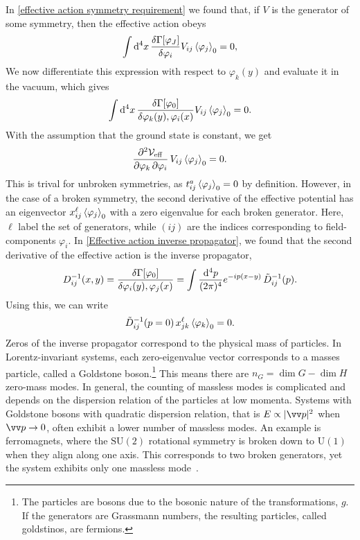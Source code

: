 In \autoref{effective action symmetry requirement} we found that, if $V$ is the generator of some symmetry, then the effective action obeys
\begin{equation}
    \int \dd^4 x\, \fdv{\Gamma[\varphi_J]}{\varphi_i} V_{ij} \ex{\varphi_j}_0 = 0,
\end{equation}
%
We now differentiate this expression with respect to $\varphi_k(y)$ and evaluate it in the vacuum, which gives
\begin{equation}
    \int \dd^4 x \, \fdv{\Gamma[\varphi_0]}{\varphi_k(y), \varphi_i(x)}
    V_{ij} \ex{\varphi_j}_0 = 0.
\end{equation}
%
With the assumption that the ground state is constant, we get 
\begin{equation}
    \pdv{\mathcal{V}_{\mathrm{eff}}}{\varphi_k, \varphi_i} \, V_{i j} \left\langle \varphi_j \right\rangle_0 = 0.
\end{equation}
%
This is trival for unbroken symmetries, as $t^a_{ij}\left\langle \varphi_j \right\rangle_0 = 0$ by definition.
However, in the case of a broken symmetry, the second derivative of the effective potential has an eigenvector $x^\ell_{ij} \left\langle \varphi_j \right\rangle_0$ with a zero eigenvalue for each broken generator.
Here, $\ell$ label the set of generators, while $(ij)$ are the indices corresponding to field-components $\varphi_i$.
In \autoref{Effective action inverse propagator}, we found that the second derivative of the effective action is the inverse propagator,
\begin{equation}
    D^{-1}_{ij}(x,y) 
    = \fdv{\Gamma[\varphi_0]}{\varphi_i(y), \varphi_j(x)}
    = \int \frac{\dd^4 p}{(2 \pi)^4} e^{-ip(x - y)} \, \tilde D^{-1}_{ij}(p).
\end{equation}
%
Using this, we can write
\begin{equation}
    \tilde D^{-1}_{i j}(p=0) \, x^\ell_{jk} \left\langle \varphi_k \right\rangle_0 
    = 0.
\end{equation}
%
Zeros of the inverse propagator correspond to the physical mass of particles.
In Lorentz-invariant systems, each zero-eigenvalue vector corresponds to a masses particle, called a Goldstone boson.\footnote{ The particles are bosons due to the bosonic nature of the transformations, $g$. If the generators are Grassmann numbers, the resulting particles, called goldstinos, are fermions.}
This means there are $n_G = \dim G -\dim H$ zero-mass modes.
In general, the counting of massless modes is complicated and depends on the dispersion relation of the particles at low momenta.
Systems with Goldstone bosons with quadratic dispersion relation, that is $E \propto |\vv p|^2$ when $\vv p \rightarrow 0$, often exhibit a lower number of massless modes.
An example is ferromagnets, where the $\mathrm{SU}(2)$ rotational symmetry is broken down to $\mathrm{U}(1)$ when they align along one axis. 
This corresponds to two broken generators, yet the system exhibits only one massless mode~\autocite{braunerSpontaneousSymmetryBreaking2010}.

